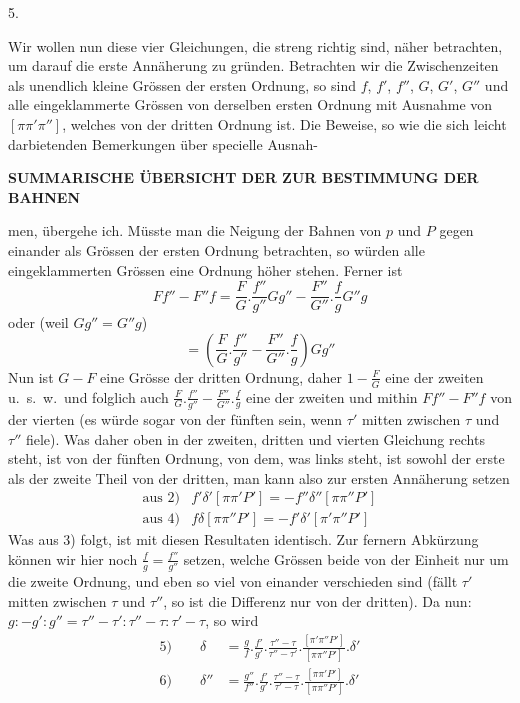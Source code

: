 \begin{center}5.\end{center}
Wir wollen nun diese vier Gleichungen, die streng richtig sind, näher betrachten, um darauf die erste Annäherung zu gründen. Betrachten wir die Zwischenzeiten als unendlich kleine Grössen der ersten Ordnung, so sind $f$, $f'$, $f''$, $G$, $G'$, $G''$ und alle eingeklammerte Grössen von derselben ersten Ordnung mit Ausnahme von $[\pi\pi'\pi'']$, welches von der dritten Ordnung ist. Die Beweise, so wie die sich leicht darbietenden Bemerkungen über specielle Ausnah-\par
\GaussVIGathering{}{20\textsuperscript{*}}
\clearpage
\thispagestyle{empty}
\noindent{}%
%
\parbox[t]{\dimexpr\linewidth-24mm\relax}{\centering\fontsize{7.4}{9.2}\selectfont\bfseries SUMMARISCHE ÜBERSICHT DER ZUR BESTIMMUNG DER BAHNEN\par}%
\makebox[12mm][r]{}\par\nobreak\medskip
\noindent men, übergehe ich. Müsste man die Neigung der Bahnen von $p$ und $P$ gegen einander als Grössen der ersten Ordnung betrachten, so würden alle eingeklammerten Grössen eine Ordnung höher stehen. Ferner ist
\[
Ff''-F''f=\frac FG.\frac{f''}{g''}Gg''-\frac{F''}{G''}.\frac fg G''g
\]
oder (weil $Gg''=G''g$)
\[
=\left(\frac FG.\frac{f''}{g''}-\frac{F''}{G''}.\frac fg\right)Gg''
\]
Nun ist $G-F$ eine Grösse der dritten Ordnung, daher $1-\frac FG$ eine der zweiten u.\ s.\ w.\ und folglich auch $\frac FG.\frac{f''}{g''}-\frac{F''}{G''}.\frac fg$ eine der zweiten und mithin $Ff''-F''f$ von der vierten (es würde sogar von der fünften sein, wenn $\tau'$ mitten zwischen $\tau$ und $\tau''$ fiele). Was daher oben in der zweiten, dritten und vierten Gleichung rechts steht, ist von der fünften Ordnung, von dem, was links steht, ist sowohl der erste als der zweite Theil von der dritten, man kann also zur ersten Annäherung setzen
\[
\begin{array}{ll}
\text{aus 2)}&f'\delta'[\pi\pi'P']=-f''\delta''[\pi\pi''P']\\
\text{aus 4)}&f\delta[\pi\pi''P']=-f'\delta'[\pi'\pi''P']
\end{array}
\]
Was aus 3) folgt, ist mit diesen Resultaten identisch. Zur fernern Abkürzung können wir hier noch $\frac fg=\frac{f''}{g''}$ setzen, welche Grössen beide von der Einheit nur um die zweite Ordnung, und eben so viel von einander verschieden sind (fällt $\tau'$ mitten zwischen $\tau$ und $\tau''$, so ist die Differenz nur von der dritten). Da nun: $g:-g':g''=\tau''-\tau':\tau''-\tau:\tau'-\tau$, so wird
\[
\begin{aligned}
5)\qquad\delta&=\frac gf.\frac{f'}{g'}.\frac{\tau''-\tau}{\tau''-\tau'}.\frac{[\pi'\pi''P']}{[\pi\pi''P']}.\delta'\\
6)\qquad\delta''&=\frac{g''}{f''}.\frac{f'}{g'}.\frac{\tau''-\tau}{\tau'-\tau}.\frac{[\pi\pi'P']}{[\pi\pi''P']}.\delta'
\end{aligned}
\]

